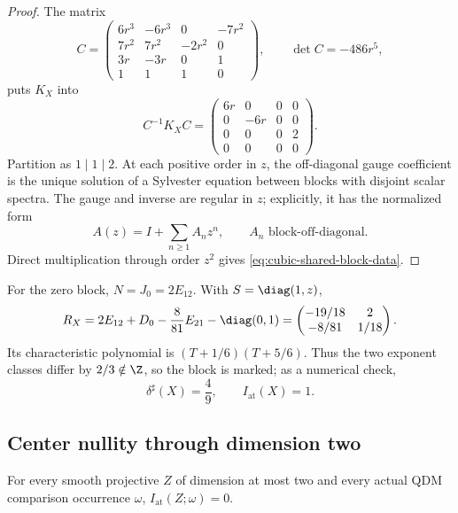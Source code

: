 \begin{proof}
The matrix
\[
 C=\begin{pmatrix}
 6r^3&-6r^3&0&-7r^2\\7r^2&7r^2&-2r^2&0\\
 3r&-3r&0&1\\1&1&1&0
 \end{pmatrix},
 \qquad \det C=-486r^5,
\]
puts \(K_X\) into
\[
 C^{-1}K_XC=
 \begin{pmatrix}6r&0&0&0\\0&-6r&0&0\\0&0&0&2\\0&0&0&0\end{pmatrix}.
\]
Partition as \(1\mid1\mid2\).  At each positive order in \(z\), the
off-diagonal gauge coefficient is the unique solution of a Sylvester
equation between blocks with disjoint scalar spectra.  The gauge and inverse
are regular in \(z\); explicitly, it has the normalized form
\begin{equation}
 A(z)=I+\sum_{n\ge1}A_nz^n,
 \qquad A_n\text{ block-off-diagonal}.
 \label{eq:cubic-integral-block-gauge}
\end{equation}
Direct multiplication through order \(z^2\) gives
\eqref{eq:cubic-shared-block-data}.
\end{proof}

For the zero block, \(N=J_0=2E_{12}\).  With \(S=\diag(1,z)\),
\begin{equation}
 R_X
 =2E_{12}+D_0-\frac8{81}E_{21}-\diag(0,1)
 =\begin{pmatrix}-19/18&2\\-8/81&1/18\end{pmatrix}.
 \label{eq:RX}
\end{equation}
Its characteristic polynomial is
\((T+1/6)(T+5/6)\).  Thus the two exponent classes differ by
\(2/3\notin\Z\), so the block is marked; as a numerical check,
\begin{equation}
 \boxed{\delta^\sharp(X)=\frac49},
 \qquad I_{\mathrm{at}}(X)=1.
 \label{eq:cubic-delta}
\end{equation}

\subsection{Center nullity through dimension two}

\begin{proposition}
\label{prop:atomic-lowdim}
%
%
%
%
For every smooth projective \(Z\) of dimension at most two and every actual
QDM comparison occurrence \(\omega\),
\(I_{\mathrm{at}}(Z;\omega)=0\).
\end{proposition}

